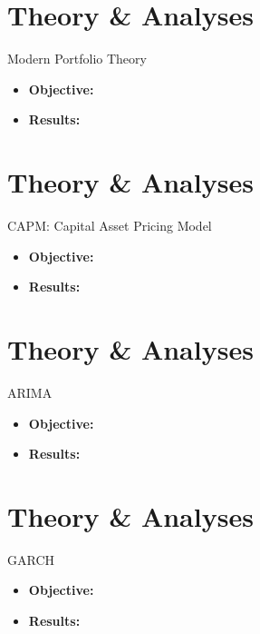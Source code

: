 \documentclass{beamer}
\begin{document}
\section{Theory & Analyses}
\begin{frame}{Modern Portfolio Theory}
    \begin{itemize}
        \item \textbf{Objective:} 
        \item \textbf{Results:} 
    \end{itemize}
\end{frame}



\section{Theory & Analyses}
\begin{frame}{CAPM: Capital Asset Pricing Model}
    \begin{itemize}
        \item \textbf{Objective:} 
        \item \textbf{Results:} 
    \end{itemize}
\end{frame}



\section{Theory & Analyses}
\begin{frame}{ARIMA}
    \begin{itemize}
        \item \textbf{Objective:}
        \item \textbf{Results:} 
    \end{itemize}
\end{frame}



\section{Theory & Analyses}
\begin{frame}{GARCH}
    \begin{itemize}
        \item \textbf{Objective:} 
        \item \textbf{Results:} 
    \end{itemize}
\end{frame}
\end{document}
